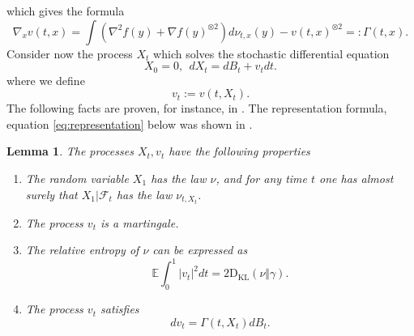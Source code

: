 \documentclass[12pt]{article}
\def \EE {\mathbb E}
\def \FF {\mathcal{F}}
\def \KL {\mathrm{D}_{\mathrm{KL}}}
\newtheorem{lemma}[theorem]{Lemma}
\theoremstyle{definition}
\theoremstyle{remark}
\begin{document}
which gives the formula
\begin{equation}\label{eq:nablavtx}
\nabla_x v(t,x) = \int \left  ( \nabla^2 f(y) + \nabla f(y)^{\otimes 2}  \right ) d \nu_{t,x}(y) - v(t,x)^{\otimes 2} =: \Gamma(t,x).
\end{equation}
Consider now the process $X_t$ which solves the stochastic differential equation
$$
X_0 = 0, ~~ d X_t = d B_t + v_t dt.
$$
where we define
$$
v_t := v(t,X_t).
$$
The following facts are proven, for instance, in \cite[Section 2.2]{EL-regularization}. The representation formula, equation \eqref{eq:representation} below was shown in \cite{Lehec-13}.
\begin{lemma} \label{lem:basicprops}
The processes $X_t, v_t$ have the following properties
\begin{enumerate}[label=(\roman*)]
\item \label{item:girsanov1}
The random variable $X_1$ has the law $\nu$, and for any time $t$ one has almost surely that $X_1| \FF_t$ has the law $\nu_{t,X_t}$.
\item
The process $v_t$ is a martingale.
\item
The relative entropy of $\nu$ can be expressed as
\begin{equation}\label{eq:representation}
\EE \int_0^1 |v_t|^2 dt = 2 \KL(\nu \Vert \gamma).
\end{equation}
\item
The process $v_t$ satisfies
\begin{equation}\label{eq:dvt22}
d v_t = \Gamma(t, X_t) d B_t.
\end{equation}
\end{enumerate}
\end{lemma}
\end{document}
